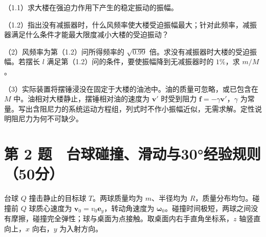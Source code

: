\documentclass[12pt,a4paper,fontset=fandol]{ctexart}
\begin{document}
（1.1）求大楼在强迫力作用下产生的稳定振动的振幅。

（1.2）指出没有减振器时，什么风频率使大楼受迫振幅最大；针对此频率，减振器满足什么条件才能最大限度减小大楼的受迫振动？

（2）风频率为第（1.2）问所得频率的 \(\sqrt{0.99}\)
倍。求没有减振器时大楼的受迫振幅。若摆长 \(l\)
满足第（1.2）问的条件，要使振幅降到无减振器时的 \(1\%\)，求 \(m/M\)。

（3）实际装置将摆锤浸没在固定于大楼的油池中。油的质量可忽略，或已包含在
\(M\) 中。油相对大楼静止，摆锤相对油的速度为 \(\boldsymbol v'\)
时受到阻力 \(\boldsymbol f=-\gamma\boldsymbol v'\)，\(\gamma\)
为常量。写出含阻尼力的系统运动方程组，列式时不作小振幅近似，无需求解。定性说明阻尼力为何不可缺少。

\clearpage

\section{第 2
题　台球碰撞、滑动与30°经验规则（50分）}\label{ux7b2c-2-ux9898-ux53f0ux7403ux78b0ux649eux6ed1ux52a8ux4e0e30ux7ecfux9a8cux89c4ux521950ux5206}

台球 \(Q\) 撞击静止的目标球 \(T\)。两球质量均为 \(m\)、半径均为
\(R\)，质量分布均匀。碰撞前 \(Q\) 球质心速度为
\(\boldsymbol v_0=v_0\boldsymbol e_y\)，转动角速度为
\(\boldsymbol\omega_0\)。碰撞时间极短，两球之间没有摩擦，碰撞完全弹性；球与桌面为点接触。取桌面内右手直角坐标系，\(z\)
轴竖直向上，\(x\) 向右，\(y\) 为入射方向。

\begin{center}
\begin{minipage}{\linewidth}
\centering\begingroup
{}
\ifdim\wd\diagrambox>.88\linewidth
\sbox{\diagrambox}{\resizebox{.88\linewidth}{!}{\usebox{\diagrambox}}}
\fi
\ifdim\ht\diagrambox>.40\textheight
\resizebox{!}{.40\textheight}{\usebox{\diagrambox}}
\else\usebox{\diagrambox}\fi
\par{}
\endgroup\end{minipage}
\end{center}
\end{document}
